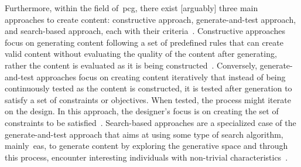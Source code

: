 




Furthermore, within the field of~\acrshort{pcg}, there exist [arguably] three main approaches to create content: constructive approach, generate-and-test approach, and search-based approach, each with their criteria~\cite{togelius_search-based_2011}. Constructive approaches focus on generating content following a set of predefined rules that can create valid content without evaluating the quality of the content after generating, rather the content is evaluated as it is being constructed~\cite{shaker_constructive_2016,green_two-step_2019,snodgrass_levels_2019}. Conversely, generate-and-test approaches focus on creating content iteratively that instead of being continuously tested as the content is constructed, it is tested after generation to satisfy a set of constraints or objectives. When tested, the process might iterate on the design. In this approach, the designer's focus is on creating the set of constraints to be satisfied~\cite{summerville_gemini_2018,volz_evolving_2018}. Search-based approaches are a specialized case of the generate-and-test approach that aims at using some type of search algorithm, mainly~\acrlong{ea}s, to generate content by exploring the generative space and through this process, encounter interesting individuals with non-trivial characteristics~\cite{hastings_evolving_2009,font_constrained_2016}.

